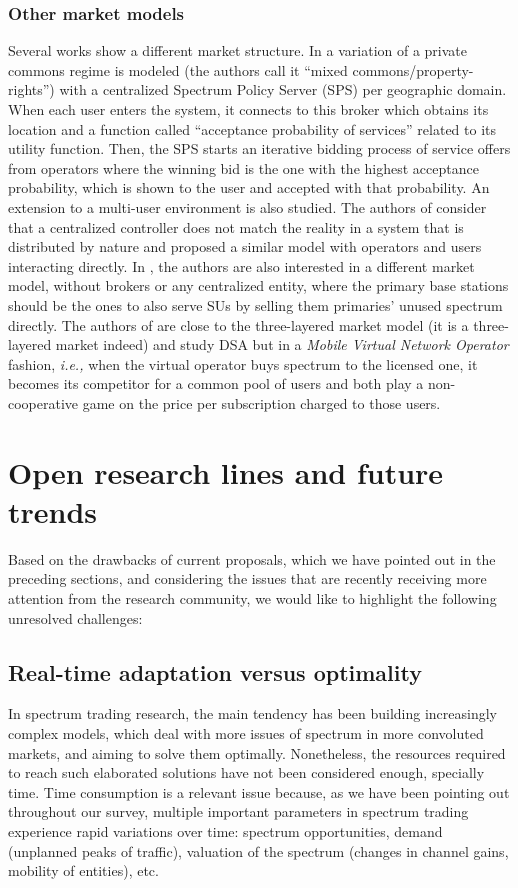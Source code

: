 \subsubsection{Other market models}
Several works show a different market structure. In \cite{ref:Illeri2005} a variation of a private commons regime is modeled (the authors call it ``mixed commons/property-rights'') with a centralized Spectrum Policy Server (SPS) per geographic domain. When each user enters the system, it connects to this broker which obtains its location and a function called ``acceptance probability of services'' related to its utility function. Then, the SPS starts an iterative bidding process of service offers from operators where the winning bid is the one with the highest acceptance probability, which is shown to the user and accepted with that probability. An extension to a multi-user environment is also studied. The authors of \cite{ref:Xing2007} consider that a centralized controller does not match the reality in a system that is distributed by nature and proposed a similar model with operators and users interacting directly. In \cite{ref:Dixit2010}, the authors are also interested in a different market model, without brokers or any centralized entity, where the primary base stations should be the ones to also serve SUs by selling them primaries' unused spectrum directly. The authors of \cite{ref:Guijarro2011} are close to the three-layered market model (it is a three-layered market indeed) and study DSA but in a \textit{Mobile Virtual Network Operator} fashion, \textit{i.e.,} when the virtual operator buys spectrum to the licensed one, it becomes its competitor for a common pool of users and both play a non-cooperative game on the price per subscription charged to those users.


\section{Open research lines and future trends}
\label{sec:Open}
Based on the drawbacks of current proposals, which we have pointed out in the preceding sections, and considering the issues that are recently receiving more attention from the research community, we would like to highlight the following unresolved challenges: 
\subsection{Real-time adaptation versus optimality}
In spectrum trading research, the main tendency has been building increasingly complex models, which deal with more issues of spectrum in more convoluted markets, and aiming to solve them optimally.
Nonetheless, the resources required to reach such elaborated solutions have not been considered enough, specially time. 
Time consumption is a relevant issue because, as we have been pointing out throughout our survey, multiple important parameters in spectrum trading experience rapid variations over time: spectrum opportunities, demand (unplanned peaks of traffic), valuation of the spectrum (changes in channel gains, mobility of entities), etc. 

